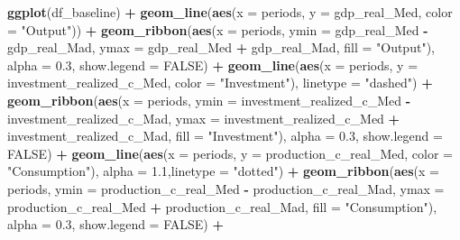 \documentclass[
]{article}
\newenvironment{Shaded}{\begin{snugshade}}{\end{snugshade}}
\newcommand{\AttributeTok}[1]{\textcolor[rgb]{0.13,0.29,0.53}{#1}}
\newcommand{\ConstantTok}[1]{\textcolor[rgb]{0.56,0.35,0.01}{#1}}
\newcommand{\FloatTok}[1]{\textcolor[rgb]{0.00,0.00,0.81}{#1}}
\newcommand{\FunctionTok}[1]{\textcolor[rgb]{0.13,0.29,0.53}{\textbf{#1}}}
\newcommand{\NormalTok}[1]{#1}
\newcommand{\SpecialCharTok}[1]{\textcolor[rgb]{0.81,0.36,0.00}{\textbf{#1}}}
\newcommand{\StringTok}[1]{\textcolor[rgb]{0.31,0.60,0.02}{#1}}
\begin{document}
\begin{Shaded}
\begin{Highlighting}[]
\FunctionTok{ggplot}\NormalTok{(df\_baseline) }\SpecialCharTok{+}
  \FunctionTok{geom\_line}\NormalTok{(}\FunctionTok{aes}\NormalTok{(}\AttributeTok{x =}\NormalTok{ periods, }\AttributeTok{y =}\NormalTok{ gdp\_real\_Med, }\AttributeTok{color =} \StringTok{"Output"}\NormalTok{)) }\SpecialCharTok{+}
  \FunctionTok{geom\_ribbon}\NormalTok{(}\FunctionTok{aes}\NormalTok{(}\AttributeTok{x =}\NormalTok{ periods, }\AttributeTok{ymin =}\NormalTok{ gdp\_real\_Med }\SpecialCharTok{{-}}\NormalTok{ gdp\_real\_Mad, }\AttributeTok{ymax =}\NormalTok{ gdp\_real\_Med }\SpecialCharTok{+}\NormalTok{ gdp\_real\_Mad, }\AttributeTok{fill =} \StringTok{"Output"}\NormalTok{), }\AttributeTok{alpha =} \FloatTok{0.3}\NormalTok{, }\AttributeTok{show.legend =} \ConstantTok{FALSE}\NormalTok{) }\SpecialCharTok{+}
  \FunctionTok{geom\_line}\NormalTok{(}\FunctionTok{aes}\NormalTok{(}\AttributeTok{x =}\NormalTok{ periods, }\AttributeTok{y =}\NormalTok{ investment\_realized\_c\_Med, }\AttributeTok{color =} \StringTok{"Investment"}\NormalTok{), }\AttributeTok{linetype =} \StringTok{"dashed"}\NormalTok{) }\SpecialCharTok{+}
  \FunctionTok{geom\_ribbon}\NormalTok{(}\FunctionTok{aes}\NormalTok{(}\AttributeTok{x =}\NormalTok{ periods, }\AttributeTok{ymin =}\NormalTok{ investment\_realized\_c\_Med }\SpecialCharTok{{-}}\NormalTok{ investment\_realized\_c\_Mad, }\AttributeTok{ymax =}\NormalTok{ investment\_realized\_c\_Med }\SpecialCharTok{+}\NormalTok{ investment\_realized\_c\_Mad, }\AttributeTok{fill =} \StringTok{"Investment"}\NormalTok{), }\AttributeTok{alpha =} \FloatTok{0.3}\NormalTok{, }\AttributeTok{show.legend =} \ConstantTok{FALSE}\NormalTok{) }\SpecialCharTok{+}
  \FunctionTok{geom\_line}\NormalTok{(}\FunctionTok{aes}\NormalTok{(}\AttributeTok{x =}\NormalTok{ periods, }\AttributeTok{y =}\NormalTok{ production\_c\_real\_Med, }\AttributeTok{color =} \StringTok{"Consumption"}\NormalTok{), }\AttributeTok{alpha =} \FloatTok{1.1}\NormalTok{,}\AttributeTok{linetype =} \StringTok{"dotted"}\NormalTok{) }\SpecialCharTok{+}
  \FunctionTok{geom\_ribbon}\NormalTok{(}\FunctionTok{aes}\NormalTok{(}\AttributeTok{x =}\NormalTok{ periods, }\AttributeTok{ymin =}\NormalTok{ production\_c\_real\_Med }\SpecialCharTok{{-}}\NormalTok{ production\_c\_real\_Mad, }\AttributeTok{ymax =}\NormalTok{ production\_c\_real\_Med }\SpecialCharTok{+}\NormalTok{ production\_c\_real\_Mad, }\AttributeTok{fill =} \StringTok{"Consumption"}\NormalTok{), }\AttributeTok{alpha =} \FloatTok{0.3}\NormalTok{, }\AttributeTok{show.legend =} \ConstantTok{FALSE}\NormalTok{) }\SpecialCharTok{+}

\end{Highlighting}
\end{Shaded}
\end{document}
